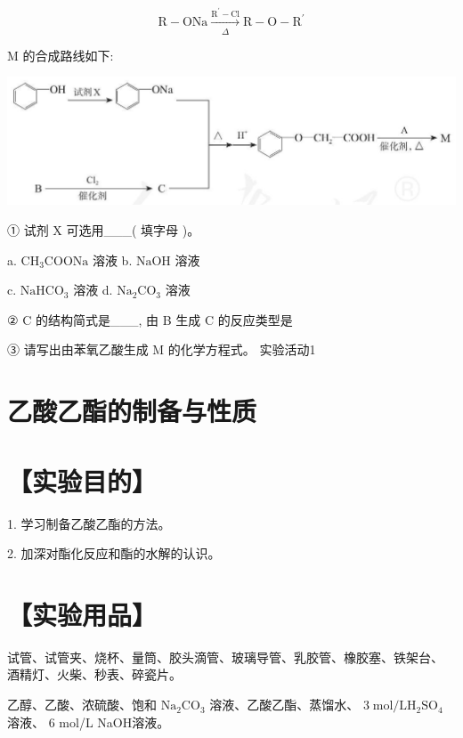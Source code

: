 \documentclass[10pt]{article}
\begin{document}
\[
\mathrm{R} - \mathrm{{ONa}}\xrightarrow[\Delta ]{{\mathrm{R}}^{\prime } - \mathrm{{Cl}}}\mathrm{R} - \mathrm{O} - {\mathrm{R}}^{\prime }
\]

\(\mathrm{M}\) 的合成路线如下:

\begin{center}
\includegraphics[max width=1.0\textwidth]{images/0190efc5-b58a-7c43-bfb0-e0a030df9cfd_102_746832.jpg}
\end{center}

① 试剂 \(\mathrm{X}\) 可选用\_\_\_( 填字母 )。

a. \({\mathrm{{CH}}}_{3}\mathrm{{COONa}}\) 溶液 b. \(\mathrm{{NaOH}}\) 溶液

c. \({\mathrm{{NaHCO}}}_{3}\) 溶液 d. \({\mathrm{{Na}}}_{2}{\mathrm{{CO}}}_{3}\) 溶液

② C 的结构简式是\_\_\_, 由 B 生成 C 的反应类型是

③ 请写出由苯氧乙酸生成 \(\mathrm{M}\) 的化学方程式。 实验活动1

\section*{乙酸乙酯的制备与性质}

\section*{【实验目的】}

1. 学习制备乙酸乙酯的方法。

2. 加深对酯化反应和酯的水解的认识。

\section*{【实验用品】}

试管、试管夹、烧杯、量筒、胶头滴管、玻璃导管、乳胶管、橡胶塞、铁架台、 酒精灯、火柴、秒表、碎瓷片。

乙醇、乙酸、浓硫酸、饱和 \({\mathrm{{Na}}}_{2}{\mathrm{{CO}}}_{3}\) 溶液、乙酸乙酯、蒸馏水、 \(3\mathrm{\;{mol}}/\mathrm{L}{\mathrm{H}}_{2}{\mathrm{{SO}}}_{4}\) 溶液、 6 mol/L NaOH溶液。
\end{document}
